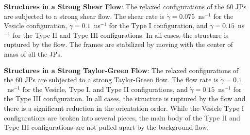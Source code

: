 


\noindent
{\bf Structures in a Strong Shear Flow}:
The relaxed configurations of the 60 JPs are subjected to a strong shear
flow. The shear rate is $\dot{\gamma} = 0.075$~ns$^{-1}$ for the Vesicle
configuration, $\dot{\gamma} = 0.1$~ns$^{-1}$ for the Type I
configuration, and $\dot{\gamma} = 0.15$~ns$^{-1}$ for the Type II and
Type III configurations. In all cases, the structure is ruptured by the
flow. The frames are stabilized by moving with the center of mass of all
the JPs.


\noindent
{\bf Structures in a Strong Taylor-Green Flow}:
The relaxed configurations of the 60 JPs are subjected to a strong
Taylor-Green flow. The flow rate is $\dot{\gamma} = 0.1$~ns$^{-1}$ for
the Vesicle, Type I, and Type II configurations, and $\dot{\gamma} =
0.15$~ns$^{-1}$ for the Type III configuration. In all cases, the
structure is ruptured by the flow and there is a significant reduction
in the orientation order. While the Vesicle Type I configurations are
broken into several pieces, the main body of the Type II and Type III
configurations are not pulled apart by the background flow.

